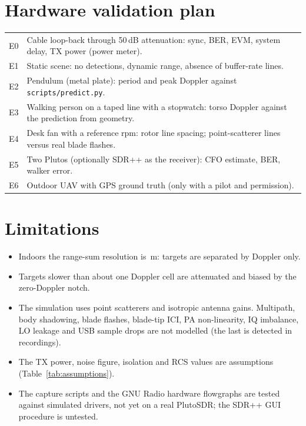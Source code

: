\documentclass[10pt,a4paper]{article}
\newcommand{\code}[1]{\texttt{#1}}
\begin{document}
\section{Hardware validation plan}\label{sec:plan}
\begin{tabularx}{\linewidth}{lL}
\toprule
E0 & Cable loop-back through 50\,dB attenuation: sync, BER, EVM, system delay, TX power (power meter).\\
E1 & Static scene: no detections, dynamic range, absence of buffer-rate lines.\\
E2 & Pendulum (metal plate): period and peak Doppler against \code{scripts/predict.py}.\\
E3 & Walking person on a taped line with a stopwatch: torso Doppler against the prediction from geometry.\\
E4 & Desk fan with a reference rpm: rotor line spacing; point-scatterer lines versus real blade flashes.\\
E5 & Two Plutos (optionally SDR++ as the receiver): CFO estimate, BER, walker error.\\
E6 & Outdoor UAV with GPS ground truth (only with a pilot and permission).\\
\bottomrule
\end{tabularx}

\section{Limitations}
\begin{itemize}
\item Indoors the range-sum resolution is \RresI\,m: targets are separated by Doppler only.
\item Targets slower than about one Doppler cell are attenuated and biased by the zero-Doppler notch.
\item The simulation uses point scatterers and isotropic antenna gains. Multipath, body shadowing, blade flashes,
blade-tip ICI, PA non-linearity, IQ imbalance, LO leakage and USB sample drops are not modelled (the last is
detected in recordings).
\item The TX power, noise figure, isolation and RCS values are assumptions (Table~\ref{tab:assumptions}).
\item The capture scripts and the GNU Radio hardware flowgraphs are tested against simulated drivers, not yet on a real
PlutoSDR; the SDR++ GUI procedure is untested.
\end{itemize}
\end{document}
